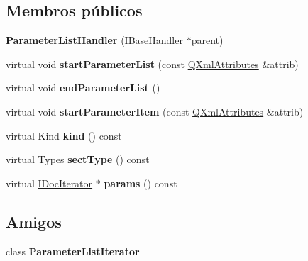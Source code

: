 \subsection*{Membros públicos}
\begin{DoxyCompactItemize}
\item 
\hypertarget{class_parameter_list_handler_a83914407b13b63e6f30a3f6c5349e12f}{{\bfseries Parameter\-List\-Handler} (\hyperlink{class_i_base_handler}{I\-Base\-Handler} $\ast$parent)}\label{class_parameter_list_handler_a83914407b13b63e6f30a3f6c5349e12f}

\item 
\hypertarget{class_parameter_list_handler_a881264a421d5674b3464a382845354db}{virtual void {\bfseries start\-Parameter\-List} (const \hyperlink{class_q_xml_attributes}{Q\-Xml\-Attributes} \&attrib)}\label{class_parameter_list_handler_a881264a421d5674b3464a382845354db}

\item 
\hypertarget{class_parameter_list_handler_a18eb29acbeb3f72b0d8f4ea23b21f054}{virtual void {\bfseries end\-Parameter\-List} ()}\label{class_parameter_list_handler_a18eb29acbeb3f72b0d8f4ea23b21f054}

\item 
\hypertarget{class_parameter_list_handler_aaf528a3aec91fda513c2d4c47b390e5a}{virtual void {\bfseries start\-Parameter\-Item} (const \hyperlink{class_q_xml_attributes}{Q\-Xml\-Attributes} \&attrib)}\label{class_parameter_list_handler_aaf528a3aec91fda513c2d4c47b390e5a}

\item 
\hypertarget{class_parameter_list_handler_af8e62c8a81ddf2283205cc8955de50eb}{virtual Kind {\bfseries kind} () const }\label{class_parameter_list_handler_af8e62c8a81ddf2283205cc8955de50eb}

\item 
\hypertarget{class_parameter_list_handler_a212651f839e63287351eefaf3f2f9a00}{virtual Types {\bfseries sect\-Type} () const }\label{class_parameter_list_handler_a212651f839e63287351eefaf3f2f9a00}

\item 
\hypertarget{class_parameter_list_handler_a1e5e6d87acb310ab01dd5e8616677111}{virtual \hyperlink{class_i_doc_iterator}{I\-Doc\-Iterator} $\ast$ {\bfseries params} () const }\label{class_parameter_list_handler_a1e5e6d87acb310ab01dd5e8616677111}

\end{DoxyCompactItemize}
\subsection*{Amigos}
\begin{DoxyCompactItemize}
\item 
\hypertarget{class_parameter_list_handler_a6ec6d833a9d9c09a3b8e37a69549ad9c}{class {\bfseries Parameter\-List\-Iterator}}\label{class_parameter_list_handler_a6ec6d833a9d9c09a3b8e37a69549ad9c}

\end{DoxyCompactItemize}

